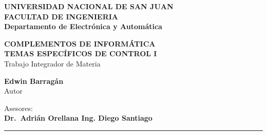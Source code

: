 \documentclass[12pt,a4paper,twosides,openright]{report}
\begin{document}
		\renewcommand{\tablename}{Tabla}

		\begin{titlepage}
			\begin{center}
				\begin{Large}
					\textbf{UNIVERSIDAD NACIONAL DE SAN JUAN\\
					\vspace*{0.05in}
					FACULTAD DE INGENIERIA\\
					\vspace*{0.05in}
					Departamento de Electrónica y Automática\\
					\vspace*{\fill}}
				\end{Large}
				\begin{Large}
					\textbf{COMPLEMENTOS DE INFORMÁTICA\\TEMAS ESPECÍFICOS DE CONTROL I} \\
					Trabajo Integrador de Materia\\
				\end{Large}
				\vspace*{\fill}
				\begin{large}
					\textbf{Edwin Barragán}\\
					Autor\\
				\end{large}
				\vspace*{0.5in}
				\begin{large}
					Asesores: \\
					\textbf{Dr.~Adrián Orellana \hspace*{3pt}
					Ing. Diego Santiago\\}
				\end{large}
				\vspace{\fill}
				\rule{80mm}{0.1mm}\\
				\vspace{.1in}
				\the\year
			\end{center}

		\end{titlepage}

		

		\tableofcontents

		
\end{document}
